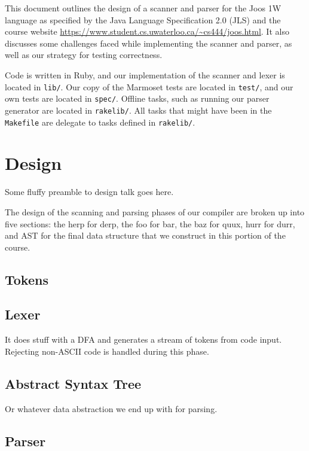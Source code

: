 \documentclass[pdftex,11pt,a4paper]{article}
\begin{document}

This document outlines the design of a scanner and parser for
the Joos 1W language as specified by the Java Language Specification
2.0 (JLS) and the course website
\url{https://www.student.cs.uwaterloo.ca/~cs444/joos.html}. It also
discusses some challenges faced while implementing the scanner and
parser, as well as our strategy for testing correctness.

Code is written in Ruby, and our implementation of the scanner and
lexer is located in \texttt{lib/}. Our copy of the Marmoset tests are
located in \texttt{test/}, and our own tests are located in
\texttt{spec/}. Offline tasks, such as running our parser generator
are located in \texttt{rakelib/}. All tasks that might have been in
the \texttt{Makefile} are delegate to tasks defined in
\texttt{rakelib/}.

\section{Design}

Some fluffy preamble to design talk goes here.

The design of the scanning and parsing phases of our compiler are
broken up into five sections: the herp for derp, the foo for bar, the
baz for quux, hurr for durr, and AST for the final data structure that
we construct in this portion of the course.


\subsection{Tokens}



\subsection{Lexer}

It does stuff with a DFA and generates a stream of tokens from code
input. Rejecting non-ASCII code is handled during this phase.


\subsection{Abstract Syntax Tree}

Or whatever data abstraction we end up with for parsing.


\subsection{Parser}
\end{document}
